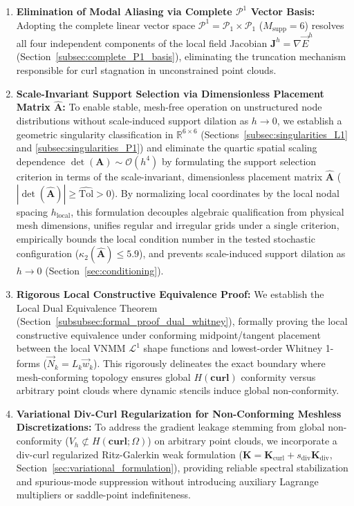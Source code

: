 \documentclass[preprint,12pt]{elsarticle}
\begin{document}
\begin{enumerate}
    \item \textbf{Elimination of Modal Aliasing via Complete $\mathcal{P}^1$ Vector Basis:} 
    Adopting the complete linear vector space $\mathcal{P}^1 = \mathcal{P}_1 \times \mathcal{P}_1$ ($M_{\mathrm{supp}} = 6$) resolves all four independent components of the local field Jacobian $\mathbf{J}^h = \nabla \vec{E}^h$ (Section~\ref{subsec:complete_P1_basis}), eliminating the truncation mechanism responsible for curl stagnation in unconstrained point clouds.

    \item \textbf{Scale-Invariant Support Selection via Dimensionless Placement Matrix $\widehat{\mathbf{A}}$:} 
    To enable stable, mesh-free operation on unstructured node distributions without scale-induced support dilation as $h \to 0$, we establish a geometric singularity classification in $\mathbb{R}^{6\times6}$ (Sections~\ref{subsec:singularities_L1} and \ref{subsec:singularities_P1}) and eliminate the quartic spatial scaling dependence $\det(\mathbf{A}) \sim \mathcal{O}(h^4)$ by formulating the support selection criterion in terms of the scale-invariant, dimensionless placement matrix $\widehat{\mathbf{A}}$ ($|\det(\widehat{\mathbf{A}})| \ge \widehat{\mathrm{Tol}} > 0$). By normalizing local coordinates by the local nodal spacing $h_{\mathrm{local}}$, this formulation decouples algebraic qualification from physical mesh dimensions, unifies regular and irregular grids under a single criterion, empirically bounds the local condition number in the tested stochastic configuration ($\kappa_2(\widehat{\mathbf{A}}) \le 5.9$), and prevents scale-induced support dilation as $h \to 0$ (Section~\ref{sec:conditioning}).

    \item \textbf{Rigorous Local Constructive Equivalence Proof:} 
    We establish the Local Dual Equivalence Theorem (Section~\ref{subsubsec:formal_proof_dual_whitney}), formally proving the local constructive equivalence under conforming midpoint/tangent placement between the local VNMM $\mathcal{L}^1$ shape functions and lowest-order Whitney 1-forms ($\vec{N}_k = L_k \vec{w}_k$). This rigorously delineates the exact boundary where mesh-conforming topology ensures global $H(\mathbf{curl})$ conformity versus arbitrary point clouds where dynamic stencils induce global non-conformity.

    \item \textbf{Variational Div-Curl Regularization for Non-Conforming Meshless Discretizations:} 
    To address the gradient leakage stemming from global non-conformity ($V_h \not\subset H(\mathbf{curl}; \Omega)$) on arbitrary point clouds, we incorporate a div-curl regularized Ritz-Galerkin weak formulation ($\mathbf{K} = \mathbf{K}_{\mathrm{curl}} + s_{\mathrm{div}} \mathbf{K}_{\mathrm{div}}$, Section~\ref{sec:variational_formulation}), providing reliable spectral stabilization and spurious-mode suppression without introducing auxiliary Lagrange multipliers or saddle-point indefiniteness.
\end{enumerate}
\end{document}
